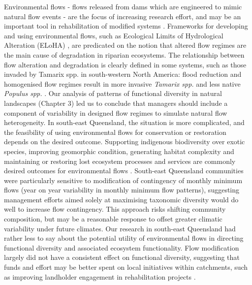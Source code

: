 \documentclass[openright,12pt,a4paper]{memoir}
\begin{document}
{{Environmental flows - flows released from dams which are engineered to mimic natural flow events - are the focus of increasing research effort, and may be an important tool in rehabilitation of modified systems \citep{Arthington2012}. Frameworks for developing and using environmental flows, such as Ecological Limits of Hydrological Alteration (ELoHA) \citep{Poff2010a}, are predicated on the notion that altered flow regimes are the main cause of degradation in riparian ecosystems. The relationship between flow alteration and degradation is clearly defined in some systems, such as those invaded by Tamarix spp. in south-western North America: flood reduction and homogenised flow regimes result in more invasive \textit{Tamarix spp.} and less native \textit{Populus spp.} \citep{Stromberg2007, Shafroth2010}. Our analysis of patterns of functional diversity in natural landscapes (Chapter 3) led us to conclude that managers should include a component of variability in designed flow regimes to simulate natural flow heterogeneity. In south-east Queensland, the situation is more complicated, and the feasibility of using environmental flows for conservation or restoration depends on the desired outcome. Supporting indigenous biodiversity over exotic species, improving geomorphic condition, generating habitat complexity and maintaining or restoring lost ecosystem processes and services are commonly desired outcomes for environmental flows \citep{Richter2007, Poff2010a, Meitzen2013}. South-east Queensland communities were particularly sensitive to modification of contingency of monthly minimum flows (year on year variability in monthly minimum flow patterns), suggesting management efforts aimed solely at maximising taxonomic diversity would do well to increase flow contingency. This approach risks shifting community composition, but may be a reasonable response to offset greater climatic variability under future climates. Our research in south-east Queensland had rather less to say about the potential utility of environmental flows in directing functional diversity and associated ecosystem functionality. Flow modification largely did not have a consistent effect on functional diversity, suggesting that funds and effort may be better spent on local initiatives within catchments, such as improving landholder engagement in rehabilitation projects \citep{McDonald2009}.

}}
\end{document}
